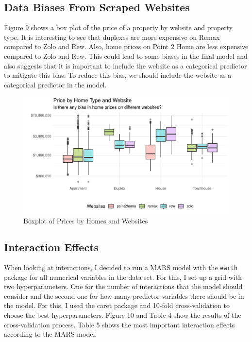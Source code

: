 \documentclass[
]{article}
\begin{document}
\newpage

\hypertarget{data-biases-from-scraped-websites}{%
\subsection{Data Biases From Scraped
Websites}\label{data-biases-from-scraped-websites}}

Figure 9 shows a box plot of the price of a property by website and
property type. It is interesting to see that duplexes are more expensive
on Remax compared to Zolo and Rew. Also, home prices on Point 2 Home are
less expensive compared to Zolo and Rew. This could lead to some biases
in the final model and also suggests that it is important to include the
website as a categorical predictor to mitigate this bias. To reduce this
bias, we should include the website as a categorical predictor in the
model.

\begin{figure}
\centering
\includegraphics{final_report_files/figure-latex/unnamed-chunk-12-1.pdf}
\caption{Boxplot of Prices by Homes and Websites}
\end{figure}

\hypertarget{interaction-effects}{%
\subsection{Interaction Effects}\label{interaction-effects}}

When looking at interactions, I decided to run a MARS model with the
\texttt{earth} package for all numerical variables in the data set. For
this, I set up a grid with two hyperparameters. One for the number of
interactions that the model should consider and the second one for how
many predictor variables there should be in the model. For this, I used
the caret package and 10-fold cross-validation to choose the best
hyperparameters. Figure 10 and Table 4 show the results of the
cross-validation process. Table 5 shows the most important interaction
effects according to the MARS model.
\end{document}
